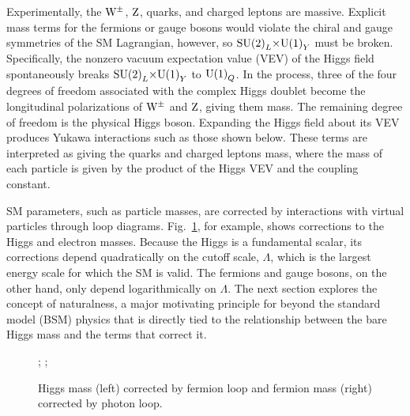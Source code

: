 \documentclass[12pt]{article}
\begin{document}
    Experimentally, the $\mathrm{W}^\pm$, $\mathrm{Z}$, quarks, and charged leptons are massive. Explicit mass terms for the fermions or gauge bosons would violate the chiral and gauge symmetries of the SM Lagrangian, however, so $\mathrm{SU} {{\left(2\right)}}_L {\times} \mathrm{U} {\left(1\right)}_Y$ must be broken. Specifically, the nonzero vacuum expectation value (VEV) of the Higgs field spontaneously breaks $\mathrm{SU} {{\left(2\right)}}_L {\times} \mathrm{U} {\left(1\right)}_Y$ to $\mathrm{U} {\left(1\right)}_Q$. In the process, three of the four degrees of freedom associated with the complex Higgs doublet become the longitudinal polarizations of $\mathrm{W}^\pm$ and $\mathrm{Z}$, giving them mass. The remaining degree of freedom is the physical Higgs boson. Expanding the Higgs field about its VEV produces Yukawa interactions such as those shown below. These terms are interpreted as giving the quarks and charged leptons mass, where the mass of each particle is given by the product of the Higgs VEV and the coupling constant.


    SM parameters, such as particle masses, are corrected by interactions with virtual particles through loop diagrams. Fig.~\ref{loop_diagrams}, for example, shows corrections to the Higgs and electron masses. Because the Higgs is a fundamental scalar, its corrections depend quadratically on the cutoff scale, $\Lambda$, which is the largest energy scale for which the SM is valid. The fermions and gauge bosons, on the other hand, only depend logarithmically on $\Lambda$. The next section explores the concept of naturalness, a major motivating principle for beyond the standard model (BSM) physics that is directly tied to the relationship between the bare Higgs mass and the terms that correct it.


    \noindent \begin{figure}[htbp] \begin{center}
        ;
        \qquad
        ;
        \caption{Higgs mass (left) corrected by fermion loop and fermion mass (right) corrected by photon loop.}
        \label{loop_diagrams}
    \end{center} \end{figure}
\end{document}
